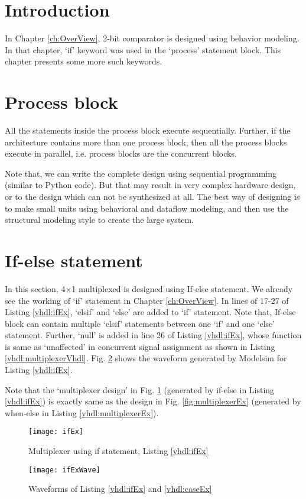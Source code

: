 \section{Introduction}
In Chapter \ref{ch:OverView}, 2-bit comparator is designed using behavior modeling. In that chapter, `if' keyword was used in the `process' statement block. This chapter presents some more such keywords. 

\section{Process block}
All the statements inside the process block execute sequentially. Further, if the architecture contains more than one process block, then all the process blocks execute in parallel, i.e. process blocks are the concurrent blocks. 

\begin{noNumBox}
	Note that, we can write the complete design using sequential programming (similar to Python code). But that may result in very complex hardware design, or to the design which can not be synthesized at all. The best way of designing is to make small units using behavioral and dataflow modeling, and then use the structural modeling style to create the large system. 
\end{noNumBox}

\section{If-else statement}
In this section, 4$\times$1 multiplexed is designed using If-else statement. We already see the working of `if' statement in Chapter \ref{ch:OverView}. In lines of 17-27 of Listing \ref{vhdl:ifEx}, `elsif' and `else' are added to `if' statement. Note that, If-else block can contain multiple `elsif' statements between one `if' and one `else' statement. Further, `null' is added in line 26 of Listing \ref{vhdl:ifEx}, whose function is same as `unaffected' in concurrent signal assignment as shown in Listing \ref{vhdl:multiplexerVhdl}. Fig. \ref{fig:ifExWave} shows the waveform generated by Modelsim for Listing \ref{vhdl:ifEx}. 

\begin{noNumBox}
	Note that the `multiplexer design' in Fig. \ref{fig:ifEx} (generated by if-else in Listing \ref{vhdl:ifEx}) is exactly same as the design in Fig. \ref{fig:multiplexerEx} (generated by when-else in Listing \ref{vhdl:multiplexerEx}). 
\end{noNumBox}

\begin{figure}
	\centering
	\texttt{[image: ifEx]}
	\caption{Multiplexer using if statement, Listing \ref{vhdl:ifEx}}
	\label{fig:ifEx}
\end{figure}
\begin{figure}
	\centering
	\texttt{[image: ifExWave]}
	\caption{Waveforms of Listing \ref{vhdl:ifEx} and \ref{vhdl:caseEx}}
	\label{fig:ifExWave}
\end{figure}




